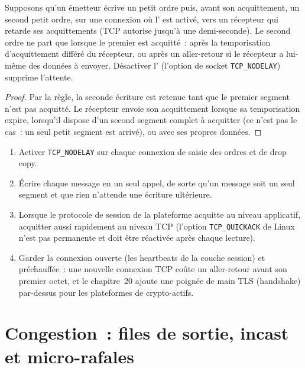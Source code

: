 \begin{proposition}\label{prop:nw:networking-for-trading:nagle}
Supposons qu'un émetteur écrive un petit ordre puis, avant son acquittement, un second petit ordre, sur une connexion où l' est activé,
vers un récepteur qui retarde ses acquittements (TCP autorise jusqu'à une demi-seconde). Le second ordre ne part que lorsque le premier est acquitté~:
après la temporisation d'acquittement différé du récepteur, ou après un aller-retour si le récepteur a lui-même des données à envoyer.
Désactiver l' (l'option de socket \texttt{TCP\_NODELAY}) supprime l'attente.
\end{proposition}

\begin{proof}
Par la règle, la seconde écriture est retenue tant que le premier segment n'est pas acquitté. Le récepteur envoie son acquittement
lorsque sa temporisation expire, lorsqu'il dispose d'un second segment complet à acquitter (ce n'est pas le cas~: un seul petit segment est arrivé), ou avec ses propres données.
\end{proof}

\begin{method}\label{met:nw:networking-for-trading:socket}
\begin{enumerate}
\item Activer \texttt{TCP\_NODELAY} sur chaque connexion de saisie des ordres et de drop copy.
\item Écrire chaque message en un seul appel, de sorte qu'un message soit un seul segment et que rien n'attende une écriture ultérieure.
\item Lorsque le protocole de session de la plateforme acquitte au niveau applicatif, acquitter aussi rapidement au niveau TCP
  (l'option \texttt{TCP\_QUICKACK} de Linux n'est pas permanente et doit être réactivée après chaque lecture).
\item Garder la connexion ouverte (les heartbeats de la couche session) et préchauffée~: une nouvelle connexion TCP coûte un aller-retour avant
  son premier octet, et le chapitre~20 ajoute une poignée de main TLS (handshake) par-dessus pour les plateformes de crypto-actifs.
\end{enumerate}
\end{method}

\section{Congestion~: files de sortie, incast et micro-rafales}

